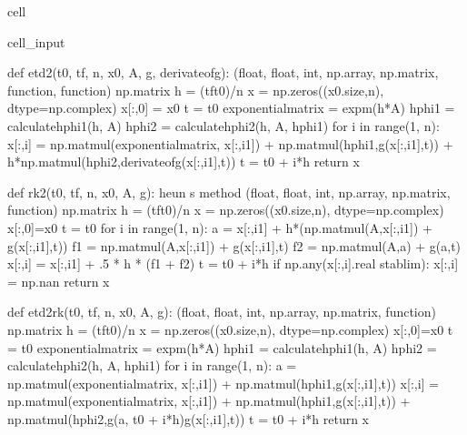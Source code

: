 \documentclass[letterpaper,10pt,english]{jupyterBook}
\begin{document}
\begin{sphinxuseclass}{cell}
\begin{sphinxVerbatimInput}
\begin{sphinxuseclass}{cell_input}
\begin{sphinxVerbatim}[commandchars=\\\{\}]
def etd2(t0, tf, n, x0, A, g, derivate\PYGZus{}of\PYGZus{}g):
    \PYGZsq{}\PYGZsq{}\PYGZsq{}(float, float, int, np.array, np.matrix, function, function) \PYGZhy{}\PYGZgt{} np.matrix\PYGZsq{}\PYGZsq{}\PYGZsq{}
    h = (tf\PYGZhy{}t0)/n
    x = np.zeros((x0.size,n), dtype=np.complex\PYGZus{})
    x[:,0] = x0
    t = t0
    exponential\PYGZus{}matrix = expm(\PYGZhy{}h*A)
    hphi1 = calculate\PYGZus{}hphi1(h, A)
    hphi2 = calculate\PYGZus{}hphi2(h, A, hphi1)
    for i in range(1, n):
        x[:,i] = np.matmul(exponential\PYGZus{}matrix, x[:,i\PYGZhy{}1]) + np.matmul(hphi1,g(x[:,i\PYGZhy{}1],t)) + h*np.matmul(hphi2,derivate\PYGZus{}of\PYGZus{}g(x[:,i\PYGZhy{}1],t))
        t = t0 + i*h
    return x

def rk2(t0, tf, n, x0, A, g): \PYGZsh{}heun s method
    \PYGZsq{}\PYGZsq{}\PYGZsq{}(float, float, int, np.array, np.matrix, function) \PYGZhy{}\PYGZgt{} np.matrix\PYGZsq{}\PYGZsq{}\PYGZsq{}
    h = (tf\PYGZhy{}t0)/n
    x = np.zeros((x0.size,n), dtype=np.complex\PYGZus{})
    x[:,0]=x0
    t = t0
    for i in range(1, n):
        a = x[:,i\PYGZhy{}1] + h*(np.matmul(\PYGZhy{}A,x[:,i\PYGZhy{}1]) + g(x[:,i\PYGZhy{}1],t))
        f1 = np.matmul(\PYGZhy{}A,x[:,i\PYGZhy{}1]) + g(x[:,i\PYGZhy{}1],t)
        f2 = np.matmul(\PYGZhy{}A,a) + g(a,t)
        x[:,i] = x[:,i\PYGZhy{}1] + .5 * h * (f1 + f2)
        t = t0 + i*h
        if np.any(x[:,i].real \PYGZgt{} stab\PYGZus{}lim):
            x[:,i] = np.nan
    return x

def etd2rk(t0, tf, n, x0, A, g):
    \PYGZsq{}\PYGZsq{}\PYGZsq{}(float, float, int, np.array, np.matrix, function) \PYGZhy{}\PYGZgt{} np.matrix\PYGZsq{}\PYGZsq{}\PYGZsq{}
    h = (tf\PYGZhy{}t0)/n
    x = np.zeros((x0.size,n), dtype=np.complex\PYGZus{})
    x[:,0]=x0
    t = t0
    exponential\PYGZus{}matrix = expm(\PYGZhy{}h*A)
    hphi1 = calculate\PYGZus{}hphi1(h, A)
    hphi2 = calculate\PYGZus{}hphi2(h, A, hphi1)
    for i in range(1, n):
        a = np.matmul(exponential\PYGZus{}matrix, x[:,i\PYGZhy{}1]) + np.matmul(hphi1,g(x[:,i\PYGZhy{}1],t))
        x[:,i] = np.matmul(exponential\PYGZus{}matrix, x[:,i\PYGZhy{}1]) + np.matmul(hphi1,g(x[:,i\PYGZhy{}1],t)) + np.matmul(hphi2,g(a, t0 + i*h)\PYGZhy{}g(x[:,i\PYGZhy{}1],t))
        t = t0 + i*h
    return x


\end{sphinxVerbatim}
\end{sphinxuseclass}
\end{sphinxVerbatimInput}
\end{sphinxuseclass}
\end{document}
